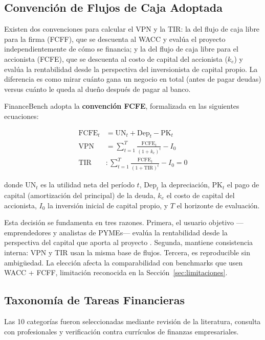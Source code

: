 \documentclass[12pt,a4paper]{article}
\begin{document}
\subsection{Convención de Flujos de Caja Adoptada}

Existen dos convenciones para calcular el VPN y la TIR: la del flujo de caja libre para la firma (FCFF), que se descuenta al WACC y evalúa el proyecto independientemente de cómo se financia; y la del flujo de caja libre para el accionista (FCFE), que se descuenta al costo de capital del accionista ($k_e$) y evalúa la rentabilidad desde la perspectiva del inversionista de capital propio. La diferencia es como mirar cuánto gana un negocio en total (antes de pagar deudas) versus cuánto le queda al dueño después de pagar al banco.

FinanceBench adopta la \textbf{convención FCFE}, formalizada en las siguientes ecuaciones:

\begin{align}
  \text{FCFE}_t &= \text{UN}_t + \text{Dep}_t - \text{PK}_t \label{eq:fcfe}\\
  \text{VPN} &= \sum_{t=1}^{T} \frac{\text{FCFE}_t}{(1+k_e)^t} - I_0 \label{eq:vpn}\\
  \text{TIR} &: \sum_{t=1}^{T} \frac{\text{FCFE}_t}{(1+\text{TIR})^t} - I_0 = 0 \label{eq:tir}
\end{align}

donde $\text{UN}_t$ es la utilidad neta del período $t$, $\text{Dep}_t$ la depreciación, $\text{PK}_t$ el pago de capital (amortización del principal) de la deuda, $k_e$ el costo de capital del accionista, $I_0$ la inversión inicial de capital propio, y $T$ el horizonte de evaluación.

Esta decisión se fundamenta en tres razones. Primera, el usuario objetivo ---emprendedores y analistas de PYMEs--- evalúa la rentabilidad desde la perspectiva del capital que aporta al proyecto \citep{SapagChain2014, BerkDeMarzo2020}. Segunda, mantiene consistencia interna: VPN y TIR usan la misma base de flujos. Tercera, es reproducible sin ambigüedad. La elección afecta la comparabilidad con benchmarks que usen WACC + FCFF, limitación reconocida en la Sección~\ref{sec:limitaciones}.

\subsection{Taxonomía de Tareas Financieras}

Las 10 categorías fueron seleccionadas mediante revisión de la literatura, consulta con profesionales y verificación contra currículos de finanzas empresariales.
\end{document}
